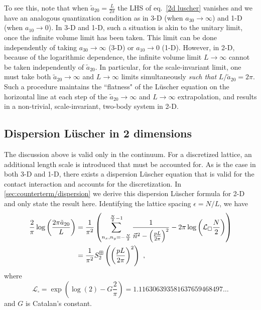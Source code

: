 To see this, note that when $\tilde a_{20}=\frac{L}{2\pi}$ the LHS of eq.~\eqref{2d luscher} vanishes and we have an analogous quantization condition as in 3-D (when $a_{30}\to\infty$) and 1-D (when $a_{10}\to 0$).  In 3-D and 1-D, such a situation is akin to the unitary limit, once the infinite volume limit has been taken.  This limit can be done independently of taking $a_{30}\to\infty$ (3-D) or $a_{10}\to0$ (1-D).  However, in 2-D, because of the logarithmic dependence, the infinite volume limit $L\to\infty$ cannot be taken independently of $\tilde a_{20}$.  In particular, for the scale-invariant limit, one must take both $\tilde a_{20}\to \infty$ and $L\to\infty$ limits simultaneously \emph{such that} $L/\tilde a_{20}=2\pi$.  Such a procedure maintains the ``flatness" of the L\"uscher equation on the horizontal line at each step of the $\tilde a_{20}\to\infty$ and $L\to\infty$ extrapolation, and results in a non-trivial, scale-invariant, two-body system in 2-D.  

\subsection{Dispersion L\"uscher in 2 dimensions}
The discussion above is valid only in the continuum.  For a discretized lattice, an additional length scale is introduced that must be accounted for.  As is the case in both 3-D and 1-D, there exists a dispersion L\"uscher equation that is valid for the contact interaction and accounts for the discretization.  In \autoref{sec:counterterm/dispersion} we derive this dispersion L\"uscher formula for 2-D and only state the result here.  Identifying the lattice spacing $\epsilon=N/L$, we have
\begin{align}
\frac{2}{\pi} \log \left(\frac{2\pi \tilde a_{20}}{L}\right)&=\frac{1}{\pi^2}\left( \sum_{n_x,n_y=-\frac{N}{2}}^{\frac{N}{2}-1}\frac{1}{\vec{n}^2-\left(\frac{pL}{2\pi}\right)^2}-2\pi \log \left(\mathcal{L}_\square\frac{N}{2}\right)\right)\nonumber\\
&=\frac{1}{\pi^2}S^{\dispersion}_2\left(\left(\frac{pL}{2\pi}\right)^2\right)\ ,\label{eq:2d dispersion luscher}
\end{align}
where
\begin{equation}
\mathcal{L}_{\square}=\exp \left(\log (2)-G \frac{2}{\pi}\right)=1.116306393581637659468497 \ldots
\end{equation}
and $G$ is Catalan's constant.

